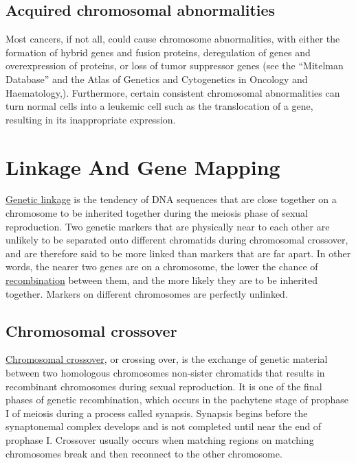 \hypertarget{acquired-chromosomal-abnormalities}{%
\section{Acquired chromosomal abnormalities}\label{acquired-chromosomal-abnormalities}}

Most cancers, if not all, could cause chromosome abnormalities, with either the formation of hybrid genes and fusion proteins, deregulation of genes and overexpression of proteins, or loss of tumor suppressor genes (see the ``Mitelman Database'' and the Atlas of Genetics and Cytogenetics in Oncology and Haematology,). Furthermore, certain consistent chromosomal abnormalities can turn normal cells into a leukemic cell such as the translocation of a gene, resulting in its inappropriate expression.

\hypertarget{linkage-and-gene-mapping}{%
\chapter{Linkage And Gene Mapping}\label{linkage-and-gene-mapping}}

\href{https://en.wikipedia.org/wiki/Genetic_linkage}{Genetic linkage} is the tendency of DNA sequences that are close together on a chromosome to be inherited together during the meiosis phase of sexual reproduction. Two genetic markers that are physically near to each other are unlikely to be separated onto different chromatids during chromosomal crossover, and are therefore said to be more linked than markers that are far apart. In other words, the nearer two genes are on a chromosome, the lower the chance of \href{https://en.wikipedia.org/wiki/Genetic_recombination}{recombination} between them, and the more likely they are to be inherited together. Markers on different chromosomes are perfectly unlinked.

\hypertarget{chromosomal-crossover}{%
\section{Chromosomal crossover}\label{chromosomal-crossover}}

\href{https://en.wikipedia.org/wiki/Chromosomal_crossover}{Chromosomal crossover}, or crossing over, is the exchange of genetic material between two homologous chromosomes non-sister chromatids that results in recombinant chromosomes during sexual reproduction. It is one of the final phases of genetic recombination, which occurs in the pachytene stage of prophase I of meiosis during a process called synapsis. Synapsis begins before the synaptonemal complex develops and is not completed until near the end of prophase I. Crossover usually occurs when matching regions on matching chromosomes break and then reconnect to the other chromosome.

